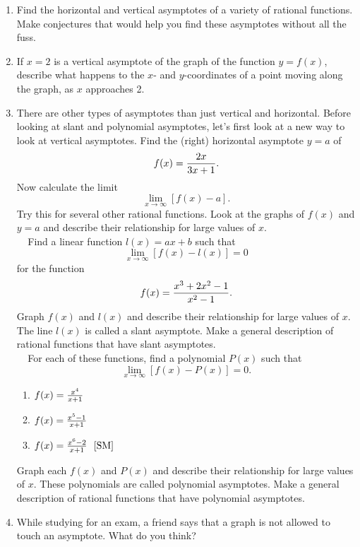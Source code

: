 \begin{enumerate}
\item  Find the horizontal and vertical asymptotes of a variety of rational functions.  Make conjectures that would help you find these asymptotes without all the fuss.

\item  If $x = 2$ is a vertical asymptote of the graph of the function $y = f(x)$, describe what happens to the $x$- and $y$-coordinates of a point moving along the graph, as $x$ approaches 2.

\item  There are other types of asymptotes than just vertical and horizontal.  Before looking at slant and polynomial asymptotes, let's first look at a new way to look at vertical asymptotes.  Find the (right) horizontal asymptote $y = a$ of $$f(x) = {{2x} \over {3x + 1}}.$$  Now calculate the limit $$\mathop {\lim }\limits_{x \to \infty } \left[ {f(x) - a} \right].$$  Try this for several other rational functions.  Look at the graphs of $f(x)$ and $y = a$ and describe their relationship for large values of $x$.
	\\\mbox{}$\ \ \ \ \ $Find a linear function $l(x) = ax + b$ such that $$\mathop {\lim }\limits_{x \to \infty } \left[ {f(x) - l(x)} \right] = 0$$ for the function $$f(x) = {{x^3  + 2x^2  - 1} \over {x^2  - 1}}.$$  Graph $f(x)$ and $l(x)$ and describe their relationship for large values of $x$.  The line $l(x)$ is called a slant asymptote.  Make a general description of rational functions that have slant asymptotes.
	\\\mbox{}$\ \ \ \ \ $For each of these functions, find a polynomial $P(x)$ such that $$\mathop {\lim }\limits_{x \to \infty } \left[ {f(x) - P(x)} \right] = 0.$$




\begin{enumerate}
\item $f(x) = {{x^4 } \over {x + 1}}$
\item $f(x) = {{x^5  - 1} \over {x + 1}}$
\item $f(x) = {{x^6  - 2} \over {x + 1}}\ \ \cite{SM}$  
\end{enumerate}
Graph each $f(x)$ and $P(x)$ and describe their relationship for large values of $x$.  These polynomials are called polynomial asymptotes.  Make a general description of rational functions that have polynomial asymptotes.

\item  While studying for an exam, a friend says that a graph is not allowed to touch an asymptote.  What do you think?


\end{enumerate}
